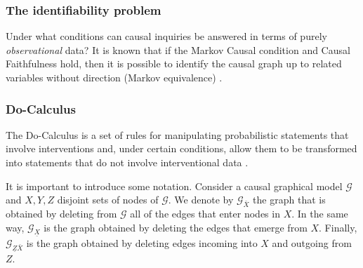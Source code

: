 \documentclass{svjour3}                     %
\begin{document}
\subsubsection{The identifiability problem}
Under what conditions can causal inquiries be answered in terms of purely \textit{observational} data? It is known that if the Markov Causal condition and Causal Faithfulness hold, then it is possible to identify the causal graph up to related variables without direction (Markov equivalence) \citep{peters2012identifiability,mooij2016distinguishing}.

\subsubsection{Do-Calculus}
The Do-Calculus is a set of rules for manipulating probabilistic statements that involve interventions and, under certain conditions, allow them to be transformed into statements that do not involve interventional data \citep{pearl1995causal,pearl2009causality}. 
	
It is important to introduce some notation. Consider a causal graphical model $\mathcal{G}$ and $X,Y,Z$ disjoint sets of nodes of $\mathcal{G}$. We denote by $\mathcal{G}_{\bar{X}}$ the graph that is obtained by deleting from $\mathcal{G}$ all of the edges that enter nodes in $X$. In the same way, $\mathcal{G}_{\underline{X}}$ is the graph obtained by deleting the edges that emerge from $X$. Finally, $\mathcal{G}_{\underline{Z}\bar{X}}$ is the graph obtained by deleting edges incoming into $X$ and outgoing from $Z$.
	
\end{document}
